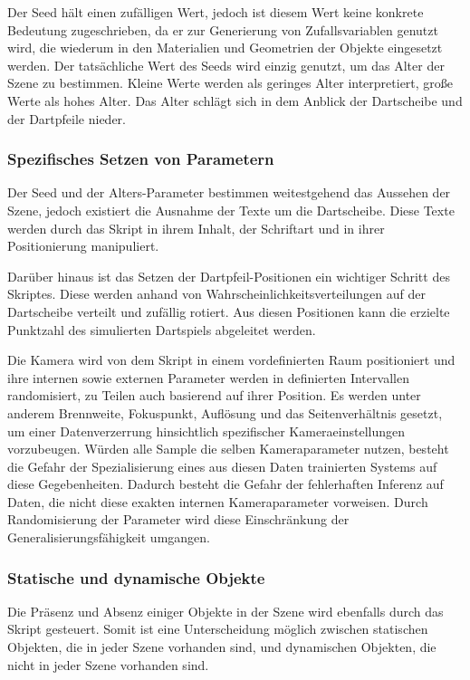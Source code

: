 Der Seed hält einen zufälligen Wert, jedoch ist diesem Wert keine konkrete Bedeutung zugeschrieben, da er zur Generierung von Zufallsvariablen genutzt wird, die wiederum in den Materialien und Geometrien der Objekte eingesetzt werden. Der tatsächliche Wert des Seeds wird einzig genutzt, um das Alter der Szene zu bestimmen. Kleine Werte werden als geringes Alter interpretiert, große Werte als hohes Alter. Das Alter schlägt sich in dem Anblick der Dartscheibe und der Dartpfeile nieder.

\subsubsection{Spezifisches Setzen von Parametern}

Der Seed und der Alters-Parameter bestimmen weitestgehend das Aussehen der Szene, jedoch existiert die Ausnahme der Texte um die Dartscheibe. Diese Texte werden durch das Skript in ihrem Inhalt, der Schriftart und in ihrer Positionierung manipuliert.

Darüber hinaus ist das Setzen der Dartpfeil-Positionen ein wichtiger Schritt des Skriptes. Diese werden anhand von Wahrscheinlichkeitsverteilungen auf der Dartscheibe verteilt und zufällig rotiert. Aus diesen Positionen kann die erzielte Punktzahl des simulierten Dartspiels abgeleitet werden.

Die Kamera wird von dem Skript in einem vordefinierten Raum positioniert und ihre internen sowie externen Parameter werden in definierten Intervallen randomisiert, zu Teilen auch basierend auf ihrer Position. Es werden unter anderem Brennweite, Fokuspunkt, Auflösung und das Seitenverhältnis gesetzt, um einer Datenverzerrung hinsichtlich spezifischer Kameraeinstellungen vorzubeugen. Würden alle Sample die selben Kameraparameter nutzen, besteht die Gefahr der Spezialisierung eines aus diesen Daten trainierten Systems auf diese Gegebenheiten. Dadurch besteht die Gefahr der fehlerhaften Inferenz auf Daten, die nicht diese exakten internen Kameraparameter vorweisen. Durch Randomisierung der Parameter wird diese Einschränkung der Generalisierungsfähigkeit umgangen.

\subsubsection{Statische und dynamische Objekte}

Die Präsenz und Absenz einiger Objekte in der Szene wird ebenfalls durch das Skript gesteuert. Somit ist eine Unterscheidung möglich zwischen statischen Objekten, die in jeder Szene vorhanden sind, und dynamischen Objekten, die nicht in jeder Szene vorhanden sind.

